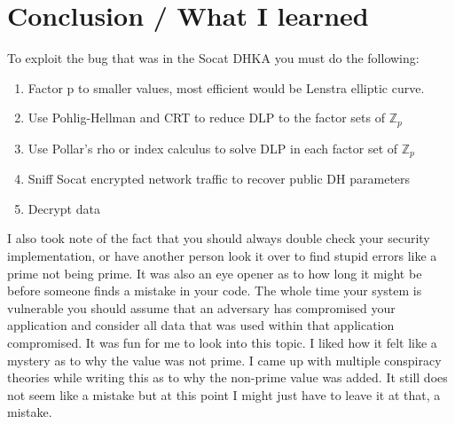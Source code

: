 \documentclass[letterpaper,11pt,notitlepage,fleqn]{article}
\begin{document}
\section{Conclusion / What I learned}
\noindent To exploit the bug that was in the Socat DHKA you must do the following:
\begin{enumerate}
    \item Factor p to smaller values, most efficient would be Lenstra elliptic curve.
    \item Use Pohlig-Hellman and CRT to reduce DLP to the factor sets of $\mathbb{Z}_{p}$
    \item Use Pollar's rho or index calculus to solve DLP in each factor set of $\mathbb{Z}_{p}$
    \item Sniff Socat encrypted network traffic to recover public DH parameters
    \item Decrypt data
\end{enumerate}
\indent I also took note of the fact that you should always double check your security implementation, or have another person look it over to find stupid errors like a prime not being prime. It was also an eye opener as to how long it might be before someone finds a mistake in your code. The whole time your system is vulnerable you should assume that an adversary has compromised your application and consider all data that was used within that application compromised.  It was fun for me to look into
this topic. I liked how it felt like a mystery as to why the value was not prime. I came up with multiple conspiracy theories while writing this as to why the non-prime value was added. It still does not seem like a mistake but at this point I might just have to leave it at that, a mistake.

\medskip
 


\end{document}
